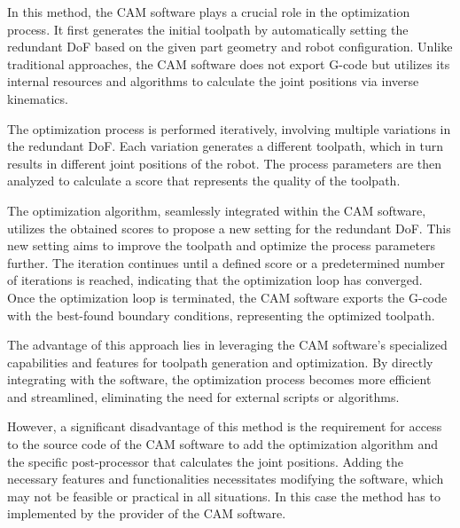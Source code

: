 In this method, the CAM software plays a crucial role in the optimization process. It first generates the initial toolpath by automatically setting the redundant DoF based on the given part geometry and robot configuration. Unlike traditional approaches, the CAM software does not export G-code but utilizes its internal resources and algorithms to calculate the joint positions via inverse kinematics.

The optimization process is performed iteratively, involving multiple variations in the redundant DoF. Each variation generates a different toolpath, which in turn results in different joint positions of the robot. The process parameters are then analyzed to calculate a score that represents the quality of the toolpath.

The optimization algorithm, seamlessly integrated within the CAM software, utilizes the obtained scores to propose a new setting for the redundant DoF. This new setting aims to improve the toolpath and optimize the process parameters further. The iteration continues until a defined score or a predetermined number of iterations is reached, indicating that the optimization loop has converged.
Once the optimization loop is terminated, the CAM software exports the G-code with the best-found boundary conditions, representing the optimized toolpath.

The advantage of this approach lies in leveraging the CAM software's specialized capabilities and features for toolpath generation and optimization. By directly integrating with the software, the optimization process becomes more efficient and streamlined, eliminating the need for external scripts or algorithms.

However, a significant disadvantage of this method is the requirement for access to the source code of the CAM software to add the optimization algorithm and the specific post-processor that calculates the joint positions. Adding the necessary features and functionalities necessitates modifying the software, which may not be feasible or practical in all situations. In this case the method has to implemented by the provider of the CAM software.